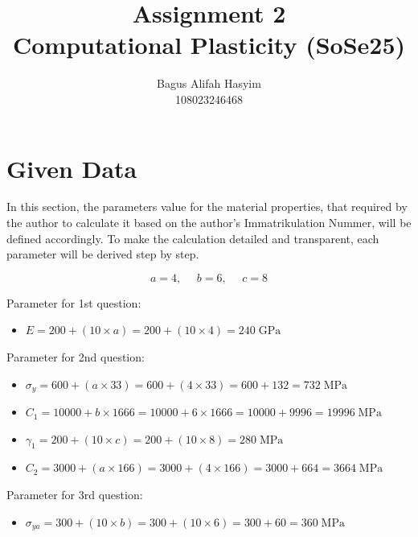 \documentclass[12pt]{article}
\title{Assignment 2 \\ \large Computational Plasticity (SoSe25)}
\author{Bagus Alifah Hasyim \\ 108023246468}
\date{}
\begin{document}
\maketitle

\section*{Given Data}
\hspace*{2em}In this section, the parameters value for the material properties, 
that required by the author to calculate it based on the author's Immatrikulation Nummer, will be defined accordingly. To make
the calculation detailed and transparent, each parameter will be derived step by step. 

\begin{equation}
    a = 4, \text{   }\text{   } b = 6, \text{   }\text{   } c = 8
\end{equation}

\vspace{1em}
Parameter for 1st question:
\begin{itemize}
    \item $E = 200 + (10 \times a) = 200 + (10 \times 4 ) = 240 \;\text{GPa}$  
    
\end{itemize}

\vspace{1em}
Parameter for 2nd question:
\begin{itemize}
    \item $\sigma_y = 600 + (a \times 33) = 600 + (4 \times 33) = 600 + 132 = 732 \;\text{MPa}$
    \item $C_1 = 10000 + b \times 1666 = 10000 + 6 \times 1666 = 10000 + 9996 = 19996 \;\text{MPa}$
    \item $\gamma_1 = 200 + (10 \times c) = 200 + (10 \times 8) = 280 \;\text{MPa}$
    \item $C_2 = 3000 + (a \times 166) = 3000 + (4 \times 166) = 3000 + 664 = 3664 \;\text{MPa}$
\end{itemize}

\vspace{1em}
Parameter for 3rd question:
\begin{itemize}
    \item $\sigma_{ya} = 300 + (10 \times b ) = 300 + (10 \times 6) = 300 + 60 = 360 \;\text{MPa}$
\end{itemize}
\end{document}
